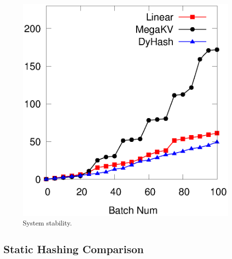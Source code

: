 \begin{figure}[ht]
\begin{minipage}{0.19\linewidth}
		\centerline{\dsali}
	\end{minipage}
	\begin{minipage}{0.19\linewidth}\centering
		\includegraphics[width=\linewidth]{pic/dynamic-stability/dynamic-sta-random.eps}
		\centerline{\dsrandom}
	\end{minipage}
	\caption{System stability.}
	\label{fig:vary-alpha-stability}
\end{figure}


\subsection{Static Hashing Comparison}\label{sec:exp:static}


